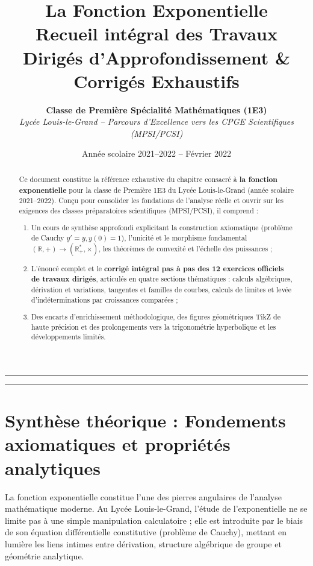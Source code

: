 \documentclass[11pt,a4paper]{article}
\title{\Huge \textbf{La Fonction Exponentielle}\\[0.4cm]
\Large Recueil intégral des Travaux Dirigés d'Approfondissement \& Corrigés Exhaustifs}
\author{\textbf{Classe de Première Spécialité Mathématiques (1E3)}\\
\textit{Lycée Louis-le-Grand -- Parcours d'Excellence vers les CPGE Scientifiques (MPSI/PCSI)}}
\date{Année scolaire 2021--2022 -- Février 2022}
\newcommand{\R}{\mathbb{R}}
\begin{document}
\maketitle

\vspace{-0.3cm}
\begin{abstract}
Ce document constitue la référence exhaustive du chapitre consacré à \textbf{la fonction exponentielle} pour la classe de Première 1E3 du Lycée Louis-le-Grand (année scolaire 2021--2022). Conçu pour consolider les fondations de l'analyse réelle et ouvrir sur les exigences des classes préparatoires scientifiques (MPSI/PCSI), il comprend :
\begin{enumerate}[label=\textbf{\Roman*.}]
    \item Un cours de synthèse approfondi explicitant la construction axiomatique (problème de Cauchy $y'=y, y(0)=1$), l'unicité et le morphisme fondamental $(\R,+) \to (\R^*_+,\times)$, les théorèmes de convexité et l'échelle des puissances ;
    \item L'énoncé complet et le \textbf{corrigé intégral pas à pas des 12 exercices officiels de travaux dirigés}, articulés en quatre sections thématiques : calculs algébriques, dérivation et variations, tangentes et familles de courbes, calculs de limites et levée d'indéterminations par croissances comparées ;
    \item Des encarts d'enrichissement méthodologique, des figures géométriques TikZ de haute précision et des prolongements vers la trigonométrie hyperbolique et les développements limités.
\end{enumerate}
\end{abstract}

\vspace{0.3cm}
\hrule
\vspace{0.3cm}
\tableofcontents
\vspace{0.5cm}
\hrule
\vspace{0.8cm}
\section{Synthèse théorique : Fondements axiomatiques et propriétés analytiques}

La fonction exponentielle constitue l'une des pierres angulaires de l'analyse mathématique moderne. Au Lycée Louis-le-Grand, l'étude de l'exponentielle ne se limite pas à une simple manipulation calculatoire ; elle est introduite par le biais de son équation différentielle constitutive (problème de Cauchy), mettant en lumière les liens intimes entre dérivation, structure algébrique de groupe et géométrie analytique.
\end{document}
